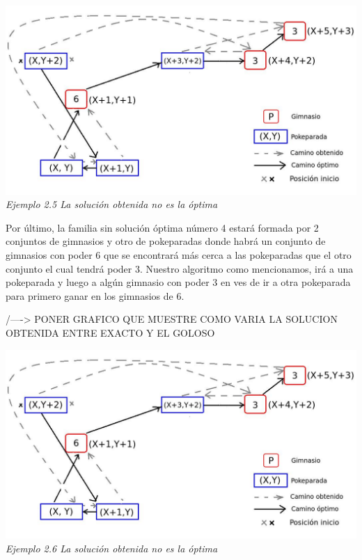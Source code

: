 \vspace*{0.3cm} \vspace*{0.3cm}
  \begin{center}
\includegraphics[scale=0.60]{./EJ2/nooptima2.jpeg}
\\{\textit{Ejemplo 2.5 La soluci\'on obtenida no es la \'optima}}
  \end{center}
  \vspace*{0.3cm}
  
  
  
Por \'ultimo, la familia sin soluci\'on \'optima n\'umero 4 estar\'a formada por 2 conjuntos de gimnasios y otro de pokeparadas donde habr\'a un conjunto de gimnasios con poder 6 que se encontrar\'a m\'as cerca a las pokeparadas que el otro conjunto el cual tendr\'a poder 3. Nuestro algoritmo como mencionamos, ir\'a a una pokeparada y luego a alg\'un gimnasio con poder 3 en ves de ir a otra pokeparada para primero ganar en los gimnasios de 6.

/----> PONER GRAFICO QUE MUESTRE COMO VARIA LA SOLUCION OBTENIDA ENTRE EXACTO Y EL GOLOSO 

\vspace*{0.3cm} \vspace*{0.3cm}
  \begin{center}
\includegraphics[scale=0.60]{./EJ2/nooptima2.jpeg}
\\{\textit{Ejemplo 2.6 La soluci\'on obtenida no es la \'optima}}
  \end{center}
  \vspace*{0.3cm}


